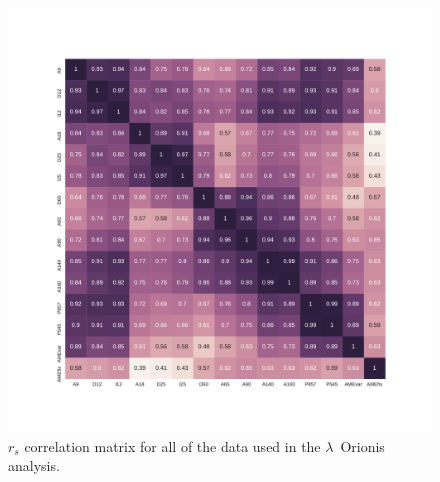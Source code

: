   \begin{figure}

    \includegraphics[width=\textwidth]{../Plots/ch_lori/Lori_corrmatrix_I.pdf}
    \centering
    \caption{$r_{s}$ correlation matrix for all of the data used in the $\lambda$~Orionis analysis.}
    \label{fig:orionis-corr-matrix}
  \end{figure}



